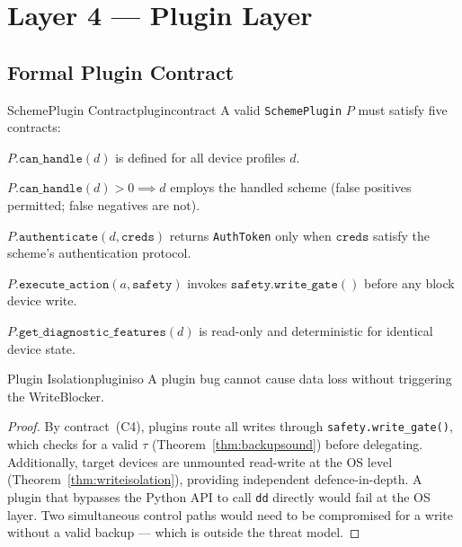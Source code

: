 \documentclass[11pt,a4paper]{report}
\begin{document}
\chapter{Layer 4 --- Plugin Layer}

\section{Formal Plugin Contract}

\begin{definition}{SchemePlugin Contract}{plugincontract}
A valid \texttt{SchemePlugin} $P$ must satisfy five contracts:
\begin{description}[noitemsep]
  \item[(C1) Totality] $P.\mathtt{can\_handle}(d)$ is defined for all device profiles $d$.
  \item[(C2) Detection Soundness] $P.\mathtt{can\_handle}(d) > 0 \implies d$ employs the handled scheme (false positives permitted; false negatives are not).
  \item[(C3) Auth Safety] $P.\mathtt{authenticate}(d, \mathtt{creds})$ returns \texttt{AuthToken} only when $\mathtt{creds}$ satisfy the scheme's authentication protocol.
  \item[(C4) Safety Delegation] $P.\mathtt{execute\_action}(a, \mathtt{safety})$ invokes $\mathtt{safety.write\_gate}()$ before any block device write.
  \item[(C5) Read Idempotency] $P.\mathtt{get\_diagnostic\_features}(d)$ is read-only and deterministic for identical device state.
\end{description}
\end{definition}

\begin{proposition}{Plugin Isolation}{pluginiso}
A plugin bug cannot cause data loss without triggering the WriteBlocker.
\end{proposition}

\begin{proof}
By contract~(C4), plugins route all writes through \texttt{safety.write\_gate()}, which checks for a valid $\tau$ (Theorem~\ref{thm:backupsound}) before delegating. Additionally, target devices are unmounted read-write at the OS level (Theorem~\ref{thm:writeisolation}), providing independent defence-in-depth. A plugin that bypasses the Python API to call \texttt{dd} directly would fail at the OS layer. Two simultaneous control paths would need to be compromised for a write without a valid backup --- which is outside the threat model.
\end{proof}
\end{document}
